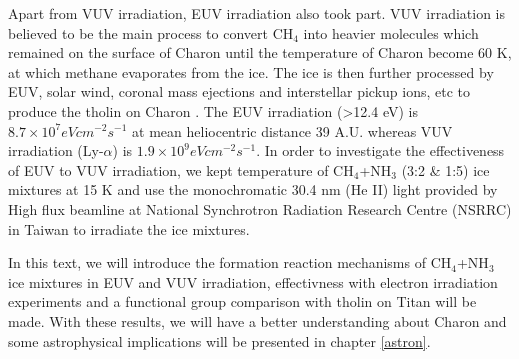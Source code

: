 Apart from VUV irradiation, EUV irradiation also took part. VUV irradiation is believed to be the main process to convert CH$_4$ into heavier molecules which remained on the surface of Charon until the temperature of Charon become 60 K, at which methane evaporates from the ice. The ice is then further processed by EUV, solar wind, coronal mass ejections and interstellar pickup ions, etc to produce the tholin on Charon \cite{grundy2016formation}. The EUV irradiation (>12.4 eV) is $8.7 \times 10^7 eV cm^{-2} s^{-1}$ at mean heliocentric distance 39 A.U. whereas VUV irradiation (Ly-$\alpha$) is $1.9 \times 10^9 eV cm^{-2} s^{-1}$\cite{grundy2016formation}. In order to investigate the effectiveness of EUV to VUV irradiation, we kept temperature of CH$_4$+NH$_3$ (3:2 \& 1:5) ice mixtures at 15 K and use the monochromatic 30.4 nm (He II) light provided by High flux beamline at National Synchrotron Radiation Research Centre (NSRRC) in Taiwan to irradiate the ice mixtures.

In this text, we will introduce the formation reaction mechanisms of CH$_4$+NH$_3$ ice mixtures in EUV and VUV irradiation, effectivness with electron irradiation experiments and a functional group comparison with tholin on Titan will be made. With these results, we will have a better understanding about Charon and some astrophysical implications will be presented in chapter \ref{astron}.
